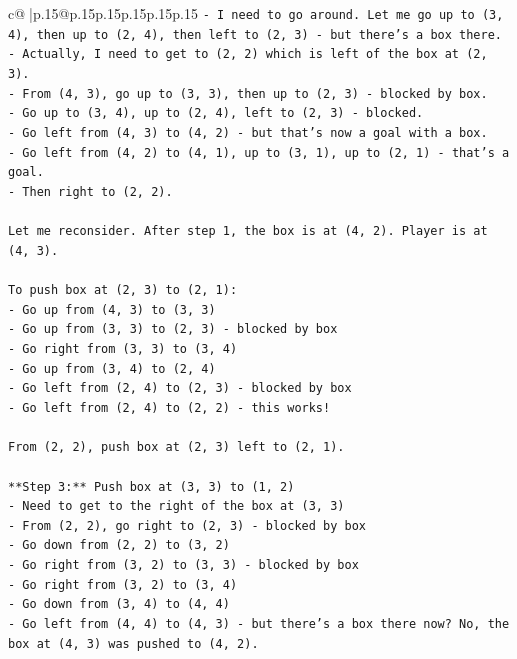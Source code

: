 \documentclass{article}
\begin{document}
{\begin{supertabular}{c@{$\;$}|p{.15\linewidth}@{}p{.15\linewidth}p{.15\linewidth}p{.15\linewidth}p{.15\linewidth}p{.15\linewidth}}
{{{\texttt{{-} I need to go around. Let me go up to (3, 4), then up to (2, 4), then left to (2, 3) {-} but there's a box there.} \\
\texttt{{-} Actually, I need to get to (2, 2) which is left of the box at (2, 3).} \\
\texttt{{-} From (4, 3), go up to (3, 3), then up to (2, 3) {-} blocked by box.} \\
\texttt{{-} Go up to (3, 4), up to (2, 4), left to (2, 3) {-} blocked.} \\
\texttt{{-} Go left from (4, 3) to (4, 2) {-} but that's now a goal with a box.} \\
\texttt{{-} Go left from (4, 2) to (4, 1), up to (3, 1), up to (2, 1) {-} that's a goal.} \\
\texttt{{-} Then right to (2, 2).} \\
\\ 
\texttt{Let me reconsider. After step 1, the box is at (4, 2). Player is at (4, 3).} \\
\\ 
\texttt{To push box at (2, 3) to (2, 1):} \\
\texttt{{-} Go up from (4, 3) to (3, 3)} \\
\texttt{{-} Go up from (3, 3) to (2, 3) {-} blocked by box} \\
\texttt{{-} Go right from (3, 3) to (3, 4)} \\
\texttt{{-} Go up from (3, 4) to (2, 4)} \\
\texttt{{-} Go left from (2, 4) to (2, 3) {-} blocked by box} \\
\texttt{{-} Go left from (2, 4) to (2, 2) {-} this works!} \\
\\ 
\texttt{From (2, 2), push box at (2, 3) left to (2, 1).} \\
\\ 
\texttt{**Step 3:** Push box at (3, 3) to (1, 2)} \\
\texttt{{-} Need to get to the right of the box at (3, 3)} \\
\texttt{{-} From (2, 2), go right to (2, 3) {-} blocked by box} \\
\texttt{{-} Go down from (2, 2) to (3, 2)} \\
\texttt{{-} Go right from (3, 2) to (3, 3) {-} blocked by box} \\
\texttt{{-} Go right from (3, 2) to (3, 4)} \\
\texttt{{-} Go down from (3, 4) to (4, 4)} \\
\texttt{{-} Go left from (4, 4) to (4, 3) {-} but there's a box there now? No, the box at (4, 3) was pushed to (4, 2).} \\
}}}
\end{supertabular}}
\end{document}

